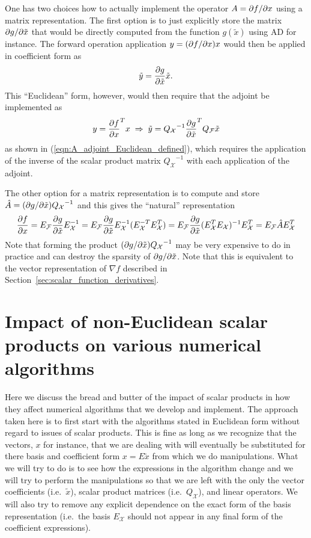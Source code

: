 \documentclass[pdf,ps2pdf,11pt]{SANDreport}
\begin{document}
One has two choices how to actually implement the operator $A = \partial f / \partial x$
using a matrix representation.  The first option is to just explicitly store
the matrix $\partial g / \partial \tilde{x}$ that would be directly computed from the
function $g(\tilde{x})$ using AD for instance.  The forward operation
application $y = (\partial f / \partial x) x$ would then be applied in coefficient form as
%
\[
\tilde{y} = \displaystyle{\frac{\partial g}{\partial \tilde{x}}} \tilde{x}.
\]
%
This ``Euclidean'' form, however, would then require that the adjoint be
implemented as
%
\begin{equation}
y = {\displaystyle{\frac{\partial f}{\partial x}}}^T x \; \Rightarrow \;
\tilde{y} = {Q_{\mathcal{X}}}^{-1} {\displaystyle{\frac{\partial g}{\partial \tilde{x}}}}^T Q_{\mathcal{F}} \tilde{x}
\label{eqn:Euclidean_adjoint_jac_apply}
\end{equation}
%
as shown in (\ref{eqn:A_adjoint_Euclidean_defined}), which requires the
application of the inverse of the scalar product matrix
${Q_{\mathcal{X}}}^{-1}$ with each application of the adjoint.

The other option for a matrix representation is to compute and store
$\hat{A} = (\partial g / \partial \tilde{x}) {Q_{\mathcal{X}}}^{-1}$ and this gives the ``natural''
representation
%
\begin{equation}
\displaystyle{\frac{\partial f}{\partial x}} = E_{\mathcal{F}} \displaystyle{\frac{\partial g}{\partial \tilde{x}}} E_{\mathcal{X}}^{-1}
= E_{\mathcal{F}} \displaystyle{\frac{\partial g}{\partial \tilde{x}}} E_{\mathcal{X}}^{-1} ( E_{\mathcal{X}}^{-T} E_{\mathcal{X}}^T ) 
= E_{\mathcal{F}} \displaystyle{\frac{\partial g}{\partial \tilde{x}}} ( E_{\mathcal{X}}^T E_{\mathcal{X}} )^{-1} E_{\mathcal{X}}^T 
= E_{\mathcal{F}} \hat{A} E_{\mathcal{X}}^T
\label{eqn:d_f_d_x_natural_rep}
\end{equation}
%
Note that forming the product $(\partial g / \partial \tilde{x}) {Q_{\mathcal{X}}}^{-1}$
may be very expensive to do in practice and can destroy the sparsity of
$\partial g / \partial \tilde{x}$.  Note that this is equivalent to the vector
representation of $\nabla f$ described in
Section~\ref{sec:scalar_function_derivatives}.

\section{Impact of non-Euclidean scalar products on various numerical algorithms}

Here we discuss the bread and butter of the impact of scalar products in how
they affect numerical algorithms that we develop and implement.  The approach
taken here is to first start with the algorithms stated in Euclidean form
without regard to issues of scalar products.  This is fine as long as we
recognize that the vectors, $x$ for instance, that we are dealing with will
eventually be substituted for there basis and coefficient form $x =
E\tilde{x}$ from which we do manipulations.  What we will try to do is to see
how the expressions in the algorithm change and we will try to perform the
manipulations so that we are left with the only the vector coefficients (i.e.\
$\tilde{x}$), scalar product matrices (i.e.\ $Q_{\mathcal{X}}$), and linear
operators.  We will also try to remove any explicit dependence on the exact
form of the basis representation (i.e.\ the basis $E_{\mathcal{X}}$ should not
appear in any final form of the coefficient expressions).
\end{document}
